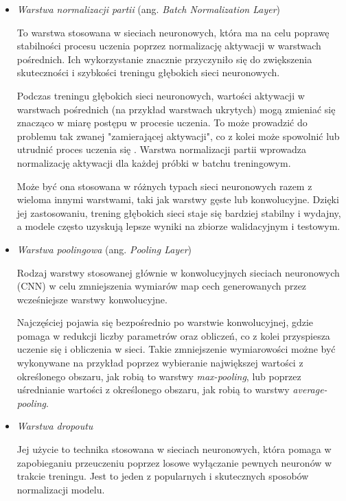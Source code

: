 \begin{itemize}
  \item \emph{Warstwa normalizacji partii} (ang. \emph{Batch Normalization Layer})

        To warstwa stosowana w sieciach neuronowych, która ma na celu poprawę stabilności procesu uczenia poprzez normalizację aktywacji w warstwach pośrednich.
        Ich wykorzystanie znacznie przyczyniło się do zwiększenia skuteczności i szybkości treningu głębokich sieci neuronowych.

        Podczas treningu głębokich sieci neuronowych, wartości aktywacji w warstwach pośrednich (na przykład warstwach ukrytych) mogą zmieniać się znacząco w miarę postępu w procesie uczenia.
        To może prowadzić do problemu tak zwanej "zamierającej aktywacji", co z kolei może spowolnić lub utrudnić proces uczenia się \cite{bjorck2018understanding}.
        Warstwa normalizacji partii wprowadza normalizację aktywacji dla każdej próbki w batchu treningowym.

        Może być ona stosowana w różnych typach sieci neuronowych razem z wieloma innymi warstwami, taki jak warstwy gęste lub konwolucyjne.
        Dzięki jej zastosowaniu, trening głębokich sieci staje się bardziej stabilny i wydajny, a modele często uzyskują lepsze wyniki na zbiorze walidacyjnym i testowym.

  \item \emph{Warstwa poolingowa} (ang. \emph{Pooling Layer})

        Rodzaj warstwy stosowanej głównie w konwolucyjnych sieciach neuronowych (CNN) w celu zmniejszenia wymiarów map cech generowanych przez wcześniejsze warstwy konwolucyjne.

        Najczęściej pojawia się bezpośrednio po warstwie konwolucyjnej, gdzie pomaga w redukcji liczby parametrów oraz obliczeń, co z kolei przyspiesza uczenie się i obliczenia w sieci.
        Takie zmniejszenie wymiarowości możne być wykonywane na przykład poprzez wybieranie największej wartości z określonego obszaru, jak robią to warstwy \emph{max-pooling}, lub poprzez uśrednianie wartości z określonego obszaru, jak robią to warstwy \emph{average-pooling}.

  \item \emph{Warstwa dropoutu}

        Jej użycie to technika stosowana w sieciach neuronowych, która pomaga w zapobieganiu przeuczeniu poprzez losowe wyłączanie pewnych neuronów w trakcie treningu.
        Jest to jeden z popularnych i skutecznych sposobów normalizacji modelu.


\end{itemize}
